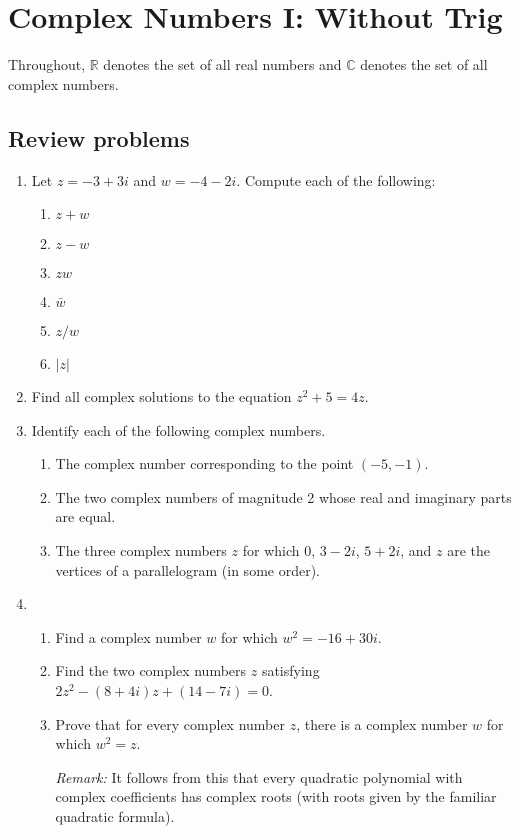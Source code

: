 \section{Complex Numbers I: Without Trig}

Throughout, $\mathbb{R}$ denotes the set of all real numbers and $\mathbb{C}$ denotes the set of all complex numbers.

\subsection{Review problems}

\begin{enumerate}
\item Let $z = -3 + 3i$ and $w = -4 - 2i$. Compute each of the following:
\begin{enumerate}
\item $z + w$
\item $z - w$
\item $zw$
\item $\bar{w}$
\item $z/w$
\item $\lvert z\rvert$
\end{enumerate}
\item Find all complex solutions to the equation $z^2 + 5 = 4z$.
\item Identify each of the following complex numbers.
\begin{enumerate}
\item The complex number corresponding to the point $(-5,-1)$.
\item The two complex numbers of magnitude 2 whose real and imaginary parts are equal.
\item The three complex numbers $z$ for which $0$, $3 - 2i$, $5 + 2i$, and $z$ are the vertices of a parallelogram (in some order).
\end{enumerate}
\item \begin{enumerate}
\item Find a complex number $w$ for which $w^2 = -16 + 30i$.
\item Find the two complex numbers $z$ satisfying $2z^2 - (8 + 4i)z + (14 - 7i) = 0$.
\item Prove that for every complex number $z$, there is a complex number $w$ for which $w^2 = z$.\par
\emph{Remark:} It follows from this that every quadratic polynomial with complex coefficients has complex roots (with roots given by the familiar quadratic formula).

\end{enumerate}
\end{enumerate}
